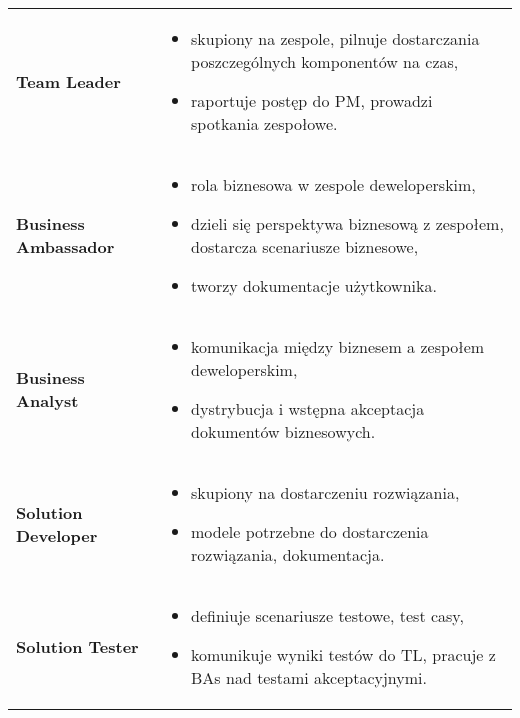 \documentclass[a4paper]{article}
\begin{document}
\begin{table}[H]
\begin{center}
\begin{tabular}{ p{} p{} }
                \textbf{Team Leader}
                &
                \begin{itemize}
                    \item skupiony na zespole, pilnuje dostarczania poszczególnych komponentów na czas,
                    \item raportuje postęp do PM, prowadzi spotkania zespołowe.
                \end{itemize}
                \\

                \textbf{Business Ambassador}
                &
                \begin{itemize}
                    \item rola biznesowa w zespole deweloperskim,
                    \item dzieli się perspektywa biznesową z zespołem, dostarcza scenariusze biznesowe,
                    \item tworzy dokumentacje użytkownika.
                \end{itemize}
                \\

                \textbf{Business Analyst}
                &
                \begin{itemize}
                    \item komunikacja między biznesem a zespołem deweloperskim,
                    \item dystrybucja i wstępna akceptacja dokumentów biznesowych.
                \end{itemize}
                \\

                \textbf{Solution Developer}
                &
                \begin{itemize}
                    \item skupiony na dostarczeniu rozwiązania,
                    \item modele potrzebne do dostarczenia rozwiązania, dokumentacja.
                \end{itemize}
                \\

                \textbf{Solution Tester}
                &
                \begin{itemize}
                    \item definiuje scenariusze testowe, test casy,
                    \item komunikuje wyniki testów do TL, pracuje z BAs nad testami akceptacyjnymi.
                \end{itemize}
                \\

            \end{tabular}
        \end{center}
    \end{table}
\end{document}
